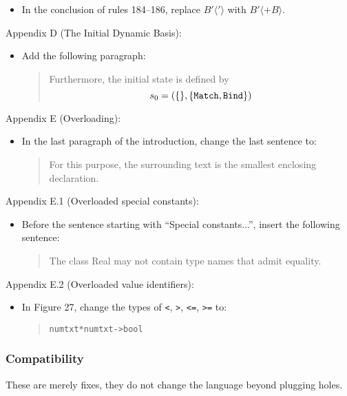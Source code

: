\documentclass[twoside,titlepage]{article}
\begin{document}
\begin{appendix}
\begin{itemize}
\item In the conclusion of rules 184--186, replace $B'\langle'\rangle$ with $B' \langle+ B\rangle$.
\end{itemize}

Appendix D (The Initial Dynamic Basis):
\begin{itemize}
\item Add the following paragraph:
  \begin{quote}
  Furthermore, the initial state is defined by
  $$
  s_0 = (\{\}, \{{\tt Match}, {\tt Bind}\})
  $$
  \end{quote}
\end{itemize}

Appendix E (Overloading):
\begin{itemize}
\item In the last paragraph of the introduction, change the last sentence to: 
  \begin{quote}
  For this purpose, the surrounding text is the smallest enclosing declaration.
  \end{quote}
\end{itemize}

Appendix E.1 (Overloaded special constants):
\begin{itemize}
\item Before the sentence starting with ``Special constants...'', insert the following sentence:
  \begin{quote}
  The class Real may not contain type names that admit equality.
  \end{quote}
\end{itemize}

Appendix E.2 (Overloaded value identifiers):
\begin{itemize}
\item In Figure 27, change the types of {\tt<}, {\tt>}, {\tt<=}, {\tt>=} to:
  \begin{quote}
  \begin{alltt}
  numtxt * numtxt -> bool
  \end{alltt}
  \end{quote}
\end{itemize}

\subsubsection*{Compatibility}

These are merely fixes, they do not change the language beyond plugging holes.



\end{appendix}
\end{document}
